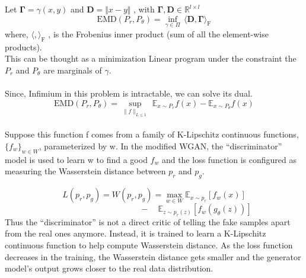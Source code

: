 \documentclass{article}
\begin{document}
Let  \(\mathbf{\Gamma} = \gamma(x,y)\) and \(\mathbf{D} = \Vert x - y \Vert\) , with \( \mathbf{\Gamma}, \mathbf{D} \in \mathbb{R}^{l \times l} \)
\[\mathrm{EMD}(P_r, P_\theta) = \inf_{\gamma \in \Pi} \, \langle \mathbf{D}, \mathbf{\Gamma} \rangle_\mathrm{F} \]
 where, \( \langle , \rangle_\mathrm{F}\) , is the Frobenius inner product (sum of all the element-wise products).
 \\
This can be thought as a minimization Linear program under the constraint the \(P_r\) and \(P_\theta\) are marginals of \(\gamma\).\\\\Since, Infimium in this problem is intractable, we can solve its dual.
 \[\mathrm{EMD}(P_r, P_\theta) = \sup_{\lVert f \lVert_{L \leq 1}} \ \mathbb{E}_{x \sim P_r} f(x) - \mathbb{E}_{x \sim P_\theta} f(x)\]
 \\
 Suppose this function f comes from a family of K-Lipschitz continuous functions, \(\{ f_w \}_{w \in W}\), parameterized by w. In the modified WGAN, the “discriminator” model is used to learn w to find a good \(f_w\) and the loss function is configured as measuring the Wasserstein distance between \(p_r\) and \(p_g\).

\[L(p_r, p_g) = W(p_r, p_g) = \max_{w \in W} \mathbb{E}_{x \sim p_r}[f_w(x)] \]
\[\quad \quad \quad \quad \quad \quad \quad \quad \quad \quad- \quad \mathbb{E}_{z \sim p_r(z)}[f_w(g_\theta(z))]\]Thus the “discriminator” is not a direct critic of telling the fake samples apart from the real ones anymore. Instead, it is trained to learn a K-Lipschitz continuous function to help compute Wasserstein distance. As the loss function decreases in the training, the Wasserstein distance gets smaller and the generator model’s output grows closer to the real data distribution.

\end{document}
